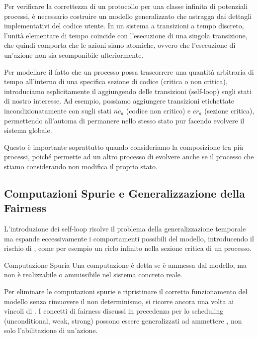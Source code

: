 Per verificare la correttezza di un protocollo per una classe infinita di potenziali processi, è necessario costruire un modello generalizzato che astragga dai dettagli implementativi del codice utente. In un sistema a transizioni a tempo discreto, l'unità elementare di tempo coincide con l'esecuzione di una singola transizione, che quindi comporta che le azioni siano atomiche, ovvero che l'esecuzione di un'azione non sia scomponibile ulteriormente.

Per modellare il fatto che un processo possa trascorrere una quantità arbitraria di tempo all'interno di una specifica sezione di codice (critica o non critica), introduciamo esplicitamente il  aggiungendo delle transizioni  (self-loop) sugli stati di nostro interesse. Ad esempio, possiamo aggiungere transizioni etichettate incondizionatamente con  sugli stati \(nc_a\) (codice non critico) e \(cr_a\) (sezione critica), permettendo all'automa di permanere nello stesso stato pur facendo evolvere il sistema globale.

Questo è importante soprattutto quando consideriamo la composizione tra più processi, poiché permette ad un altro processo di evolvere anche se il processo che stiamo considerando non modifica il proprio stato.

\subsection{Computazioni Spurie e Generalizzazione della Fairness}

L'introduzione dei self-loop risolve il problema della generalizzazione temporale ma espande eccessivamente i comportamenti possibili del modello, introducendo il rischio di , come per esempio un ciclo infinito nella sezione critica di un processo.

\begin{definition}{Computazione Spuria}
  Una computazione è detta  se è ammessa dal modello, ma non è realizzabile o ammissibile nel sistema concreto reale.
\end{definition}

Per eliminare le computazioni spurie e ripristinare il corretto funzionamento del modello senza rimuovere il non determinismo, si ricorre ancora una volta ai vincoli di . I concetti di fairness discussi in precedenza per lo scheduling (unconditional, weak, strong) possono essere generalizzati ad ammettere , non solo l'abilitazione di un'azione.

